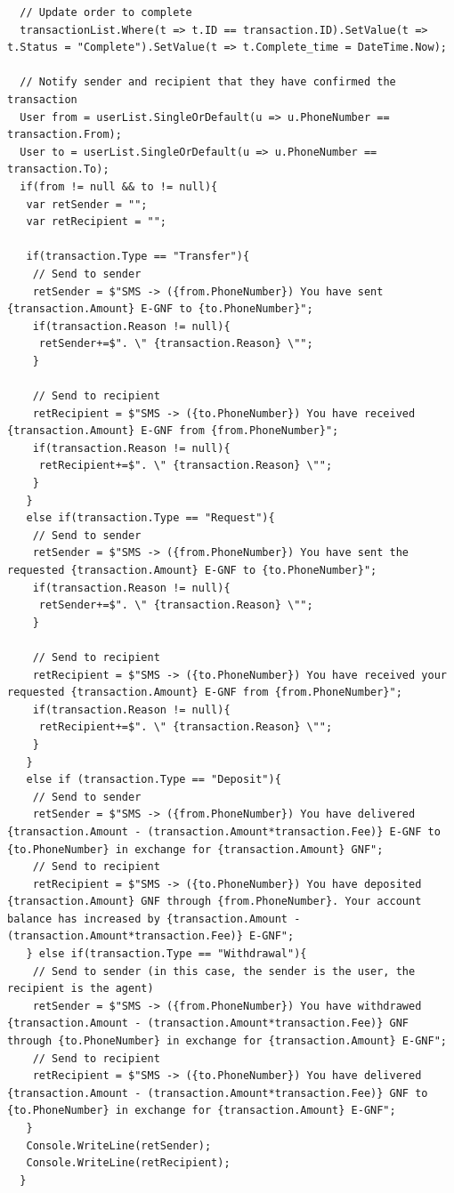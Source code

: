 \documentclass[11pt, a4paper]{article}
\begin{document}
\begin{appendices}
\begin{lstlisting}
  // Update order to complete
  transactionList.Where(t => t.ID == transaction.ID).SetValue(t => t.Status = "Complete").SetValue(t => t.Complete_time = DateTime.Now);

  // Notify sender and recipient that they have confirmed the transaction
  User from = userList.SingleOrDefault(u => u.PhoneNumber == transaction.From);
  User to = userList.SingleOrDefault(u => u.PhoneNumber == transaction.To);
  if(from != null && to != null){
   var retSender = "";
   var retRecipient = "";

   if(transaction.Type == "Transfer"){
    // Send to sender
    retSender = $"SMS -> ({from.PhoneNumber}) You have sent {transaction.Amount} E-GNF to {to.PhoneNumber}";
    if(transaction.Reason != null){
     retSender+=$". \" {transaction.Reason} \"";
    }

    // Send to recipient
    retRecipient = $"SMS -> ({to.PhoneNumber}) You have received {transaction.Amount} E-GNF from {from.PhoneNumber}";
    if(transaction.Reason != null){
     retRecipient+=$". \" {transaction.Reason} \"";
    }
   }
   else if(transaction.Type == "Request"){
    // Send to sender
    retSender = $"SMS -> ({from.PhoneNumber}) You have sent the requested {transaction.Amount} E-GNF to {to.PhoneNumber}";
    if(transaction.Reason != null){
     retSender+=$". \" {transaction.Reason} \"";
    }

    // Send to recipient
    retRecipient = $"SMS -> ({to.PhoneNumber}) You have received your requested {transaction.Amount} E-GNF from {from.PhoneNumber}";
    if(transaction.Reason != null){
     retRecipient+=$". \" {transaction.Reason} \"";
    }
   }
   else if (transaction.Type == "Deposit"){
    // Send to sender
    retSender = $"SMS -> ({from.PhoneNumber}) You have delivered {transaction.Amount - (transaction.Amount*transaction.Fee)} E-GNF to {to.PhoneNumber} in exchange for {transaction.Amount} GNF";
    // Send to recipient
    retRecipient = $"SMS -> ({to.PhoneNumber}) You have deposited {transaction.Amount} GNF through {from.PhoneNumber}. Your account balance has increased by {transaction.Amount - (transaction.Amount*transaction.Fee)} E-GNF";
   } else if(transaction.Type == "Withdrawal"){
    // Send to sender (in this case, the sender is the user, the recipient is the agent)
    retSender = $"SMS -> ({from.PhoneNumber}) You have withdrawed {transaction.Amount - (transaction.Amount*transaction.Fee)} GNF through {to.PhoneNumber} in exchange for {transaction.Amount} E-GNF";
    // Send to recipient
    retRecipient = $"SMS -> ({to.PhoneNumber}) You have delivered {transaction.Amount - (transaction.Amount*transaction.Fee)} GNF to {to.PhoneNumber} in exchange for {transaction.Amount} E-GNF";
   }
   Console.WriteLine(retSender);
   Console.WriteLine(retRecipient);
  }




\end{lstlisting}
\end{appendices}
\end{document}
